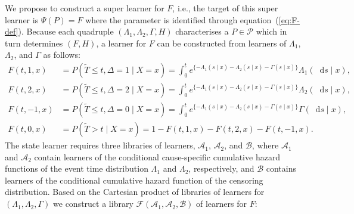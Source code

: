 \documentclass{statsoc}
\newcommand*\diff{\mathop{}\!\mathrm{d}}
\newcommand{\midd}{\; \middle|\;}
\newcommand{\1}{\mathds{1}}
\newcommand{\data}{\ensuremath{\mathcal{D}}}
\begin{document}
We propose to construct a super learner for \( F \), i.e., the target of this
super learner is $\Psi(P) = F$ where the parameter is identified through
equation~(\ref{eq:F-def}). Because each quadruple
$(\Lambda_{1}, \Lambda_{2}, \Gamma, H)$ characterises a \(P\in\mathcal P\) which
in turn determines \( (F, H) \), a learner for \( F \) can be constructed from
learners of \( \Lambda_1 \), \( \Lambda_2 \), and $\Gamma$ as follows:
\begin{equation}\label{eq:transition}
  \begin{split}
  F(t, 1, x)
  & = P(\tilde{T} \leq t, \Delta=1 \mid X=x)
    = \int_0^t e^{\{-\Lambda_{1}(s \mid x)-\Lambda_{2}(s \mid x) - \Gamma(s \mid x)\} }  \Lambda_{1}(\diff s \mid x),
  \\
  F(t, 2, x)
  & = P(\tilde{T} \leq t, \Delta=2 \mid X=x)
    = \int_0^t e^{\{-\Lambda_{1}(s \mid x)-\Lambda_{2}(s \mid x) - \Gamma(s \mid x)\} }  \Lambda_{2}(\diff s \mid x),
  \\
  F(t, -1, x)
  & =
    P(\tilde{T} \leq t, \Delta=0 \mid X=x)
    = \int_0^t e^{\{-\Lambda_{1}(s \mid x)-\Lambda_{2}(s \mid x) - \Gamma(s \mid x)\} }  \Gamma(\diff s \mid x),
  \\
  F(t, 0, x)
  &
    = P(\tilde{T} > t \mid X= x)
    = 1- F(t, 1, x) - F(t, 2, x)- F(t, -1, x).
  \end{split}
\end{equation}
The state learner requires three libraries of learners, \(\mathcal{A}_1\),
\( \mathcal{A}_2 \), and \( \mathcal{B} \), where \(\mathcal{A}_1\) and
\( \mathcal{A}_2\) contain learners of the conditional cause-specific cumulative
hazard functions of the event time distribution \(\Lambda_1\) and
\( \Lambda_2\), respectively, and \(\mathcal{B}\) contains learners of the
conditional cumulative hazard function of the censoring
distribution. %
Based on the Cartesian product of
libraries of learners for \((\Lambda_1,\Lambda_2,\Gamma)\) we construct a library
$\mathcal{F}(\mathcal{A}_1, \mathcal{A}_2, \mathcal{B})$ of learners
for \( F \):
\end{document}
